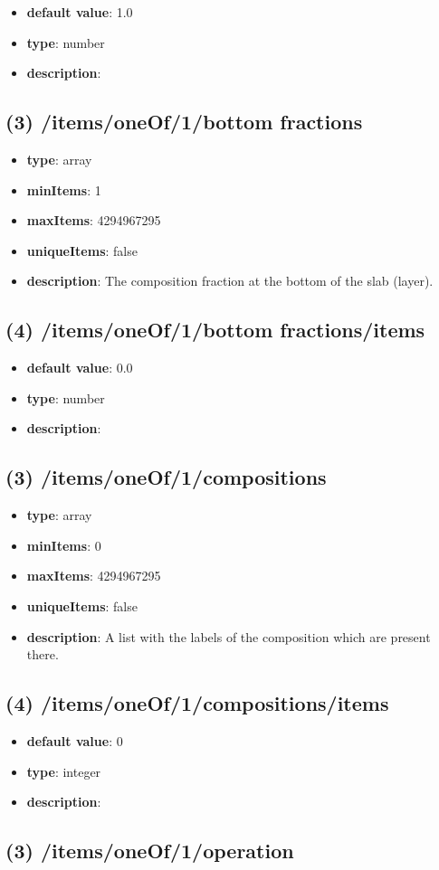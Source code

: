 \begin{itemize}[leftmargin=4em]\item {\bf default value}: 1.0
\item {\bf type}: number
\item {\bf description}: 
\end{itemize}\subsection{(3) /items/oneOf/1/bottom fractions}
\begin{itemize}[leftmargin=3em]\item {\bf type}: array
\item {\bf minItems}: 1
\item {\bf maxItems}: 4294967295
\item {\bf uniqueItems}: false
\item {\bf description}: The composition fraction at the bottom of the slab (layer).
\end{itemize}\subsection{(4) /items/oneOf/1/bottom fractions/items}
\begin{itemize}[leftmargin=4em]\item {\bf default value}: 0.0
\item {\bf type}: number
\item {\bf description}: 
\end{itemize}\subsection{(3) /items/oneOf/1/compositions}
\begin{itemize}[leftmargin=3em]\item {\bf type}: array
\item {\bf minItems}: 0
\item {\bf maxItems}: 4294967295
\item {\bf uniqueItems}: false
\item {\bf description}: A list with the labels of the composition which are present there.
\end{itemize}\subsection{(4) /items/oneOf/1/compositions/items}
\begin{itemize}[leftmargin=4em]\item {\bf default value}: 0
\item {\bf type}: integer
\item {\bf description}: 
\end{itemize}\subsection{(3) /items/oneOf/1/operation}
